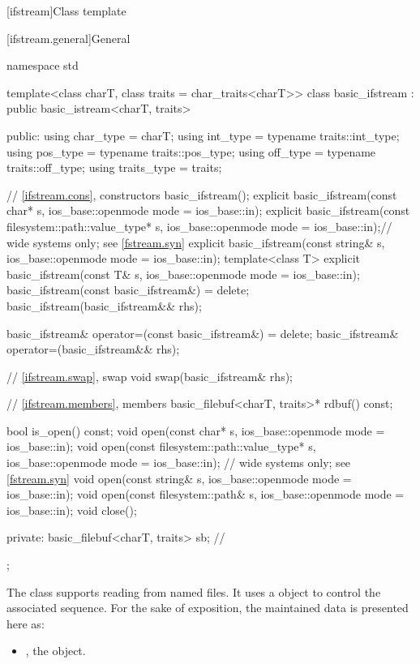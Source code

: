 [ifstream]{Class template }

[ifstream.general]{General}

%
\begin{codeblock}
namespace std {
  template<class charT, class traits = char_traits<charT>>
  class basic_ifstream : public basic_istream<charT, traits> {
  public:
    using char_type   = charT;
    using int_type    = typename traits::int_type;
    using pos_type    = typename traits::pos_type;
    using off_type    = typename traits::off_type;
    using traits_type = traits;

    // \ref{ifstream.cons}, constructors
    basic_ifstream();
    explicit basic_ifstream(const char* s,
                            ios_base::openmode mode = ios_base::in);
    explicit basic_ifstream(const filesystem::path::value_type* s,
                            ios_base::openmode mode = ios_base::in);// wide systems only; see \ref{fstream.syn}
    explicit basic_ifstream(const string& s,
                            ios_base::openmode mode = ios_base::in);
    template<class T>
      explicit basic_ifstream(const T& s, ios_base::openmode mode = ios_base::in);
    basic_ifstream(const basic_ifstream&) = delete;
    basic_ifstream(basic_ifstream&& rhs);

    basic_ifstream& operator=(const basic_ifstream&) = delete;
    basic_ifstream& operator=(basic_ifstream&& rhs);

    // \ref{ifstream.swap}, swap
    void swap(basic_ifstream& rhs);

    // \ref{ifstream.members}, members
    basic_filebuf<charT, traits>* rdbuf() const;

    bool is_open() const;
    void open(const char* s, ios_base::openmode mode = ios_base::in);
    void open(const filesystem::path::value_type* s,
              ios_base::openmode mode = ios_base::in);  // wide systems only; see \ref{fstream.syn}
    void open(const string& s, ios_base::openmode mode = ios_base::in);
    void open(const filesystem::path& s, ios_base::openmode mode = ios_base::in);
    void close();

  private:
    basic_filebuf<charT, traits> sb;    // \expos
  };
}
\end{codeblock}

\pnum
The class
supports reading from named files.
It uses a
object to control the associated
sequence.
For the sake of exposition, the maintained data is presented here as:
\begin{itemize}
\item
{}, the  object.
\end{itemize}

